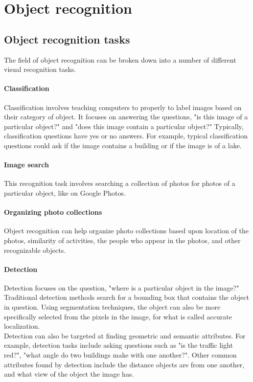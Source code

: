 \documentclass{article}
\begin{document}
\section{Object recognition}

\subsection{Object recognition tasks}
The field of object recognition can be broken down into a number of different visual recognition tasks. 

\paragraph{Classification} 
Classification involves teaching computers to properly to label images based on their category of object. It focuses on answering the questions, "is this image of a particular object?" and "does this image contain a particular object?" Typically, classification questions have yes or no answers. For example, typical classification questions could ask if the image contains a building or if the image is of a lake.

\paragraph{Image search} 
This recognition task involves searching a collection of photos for photos of a particular object, like on Google Photos.

\paragraph{Organizing photo collections} 
Object recognition can help organize photo collections based upon location of the photos, similarity of activities, the people who appear in the photos, and other recognizable objects.

\paragraph{Detection}
Detection focuses on the question, "where is a particular object in the image?" Traditional detection methods search for a bounding box that contains the object in question. Using segmentation techniques, the object can also be more specifically selected from the pixels in the image, for what is called accurate localization. \\
Detection can also be targeted at finding geometric and semantic attributes. For example, detection tasks include asking questions such as "is the traffic light red?", "what angle do two buildings make with one another?". Other common attributes found by detection include the distance objects are from one another, and what view of the object the image has.
\end{document}
